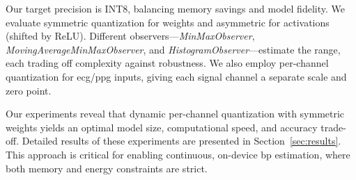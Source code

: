 Our target precision is INT8, balancing memory savings and model fidelity. We evaluate symmetric quantization for weights and asymmetric for activations (shifted by ReLU). Different observers—\emph{MinMaxObserver}, \emph{MovingAverageMinMaxObserver}, and \emph{HistogramObserver}—estimate the range, each trading off complexity against robustness. We also employ per-channel quantization for \gls{ecg}/\gls{ppg} inputs, giving each signal channel a separate scale and zero point.

Our experiments reveal that dynamic per-channel quantization with symmetric weights yields an optimal model size, computational speed, and accuracy trade-off. Detailed results of these experiments are presented in Section~\ref{sec:results}. This approach is critical for enabling continuous, on-device \gls{bp} estimation, where both memory and energy constraints are strict.